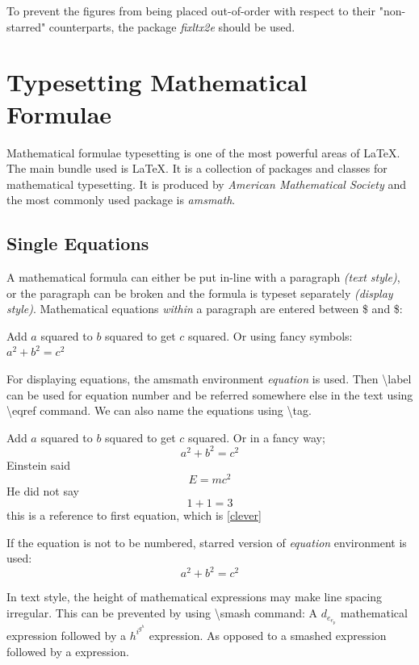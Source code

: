 \documentclass[10pt, a4paper]{article}
\begin{document}
To prevent the figures from being placed out-of-order with respect to their "non-starred" counterparts, the package \textsl{fixltx2e} should be used.
\clearpage
\section{Typesetting Mathematical Formulae}
Mathematical formulae typesetting is one of the most powerful areas of \LaTeX. The main bundle used is \AmS \LaTeX. It is a collection of packages and classes for mathematical typesetting. It is produced by \emph{American Mathematical Society} and the most commonly used package is \textsl{amsmath}. 
\subsection{Single Equations}
A mathematical formula can either be put in-line with a paragraph \textsl{(text style)}, or the paragraph can be broken and the formula is typeset separately \textsl{(display style)}. Mathematical equations \emph{within} a paragraph are entered between \$ and \$:

Add $a$ squared to $b$ squared to get $c$ squared. Or using fancy symbols: $a^2+b^2=c^2$

For displaying equations, the amsmath environment \emph{equation} is used. Then \textbackslash label can be used for equation number and be referred somewhere else in the text using \textbackslash eqref command. We can also name the equations using \textbackslash tag.

Add $a$ squared to $b$ squared to get $c$ squared. Or in a fancy way;
\begin{equation}
a^2+b^2=c^2
\end{equation}
Einstein said
\begin{equation}
E =mc^2 \label{clever}
\end{equation}
He did not say
\begin{equation}
1+1=3 \tag{dumb}
\end{equation}
this is a reference to first equation, which is \eqref{clever}

If the equation is not to be numbered, starred version of \emph{equation} environment is used:
\begin{equation*}
a^2+b^2=c^2
\end{equation*}

In text style, the height of mathematical expressions may make line spacing irregular. This can be prevented by using \textbackslash smash command:
A $d_{e_{e_p}}$ mathematical expression followed by a $h^{i^{g^h}}$ expression. As
opposed to a smashed  expression followed by a  expression.
\end{document}
